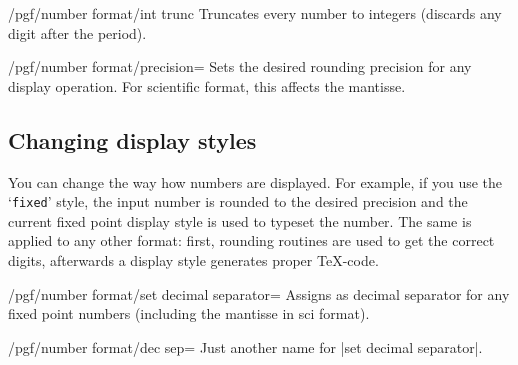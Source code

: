 \begin{key}{/pgf/number format/int trunc}
Truncates every number to integers (discards any digit after the period).

\begin{codeexample}[]
\hspace{1em}
\hspace{1em}
\hspace{1em}
\hspace{1em}
\end{codeexample}
\end{key}

\begin{key}{/pgf/number format/precision=}
Sets the desired rounding precision for any display operation. For scientific format, this affects the mantisse.
\end{key}

\subsection{Changing display styles}%
\label{sec:number:styles}%
You can change the way how numbers are displayed. For example, if you use the `\texttt{fixed}' style, the input number is rounded to the desired precision and the current fixed point display style is used to typeset the number. The same is applied to any other format: first, rounding routines are used to get the correct digits, afterwards a display style generates proper \TeX-code.

\begin{key}{/pgf/number format/set decimal separator=}
Assigns  as decimal separator for any fixed point numbers (including the mantisse in sci format).
\end{key}
\begin{key}{/pgf/number format/dec sep=}
	Just another name for |set decimal separator|.
\end{key}


